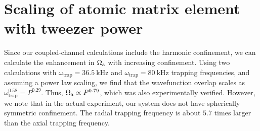 \documentclass[aps,prx,secnumarabic,amsmath,amssymb,10pt,superscriptaddress]{revtex4-2}
\newcommand{\todo}[1]{}
\begin{document}
\section{Scaling of atomic matrix element with tweezer power}

Since our coupled-channel calculations include the harmonic confinement, we can calculate the enhancement in $\Omega_{\rm a}$ with increasing confinement. Using two calculations with $ \omega_{\text{trap}} = 36.5~\mathrm{kHz}$ and $\omega_{\text{trap}} = 80~\mathrm{kHz}$ trapping frequencies, and assuming a power law scaling, we find that the wavefunction overlap scales as $ \omega_{\text{trap}}^{0.58} = P^{0.29} $. Thus, $\Omega_{\rm a} \propto P^{0.79} $, which was also experimentally verified. However, we note that in the actual experiment, our system does not have spherically symmetric confinement. The radial trapping frequency is about $5.7$ times larger than the axial trapping frequency.
\todo{
  Power/intensity calibration
}


\end{document}
